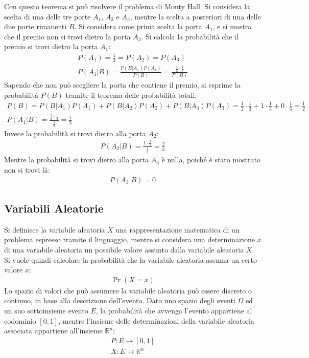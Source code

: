 \documentclass{article}
\numberwithin{equation}{subsection}
\begin{document}
Con questo teorema si può risolvere il problema di Monty Hall. Si considera la scelta di una delle tre porte $A_1$, $A_2$ e $A_3$, mentre la scelta a posteriori di una delle 
due porte rimanenti $B$. Si considera come prima scelta la porta $A_1$, e si mostra che il premio non si trovi dietro la porta $A_3$. Si calcola la probabilità che il premio 
si trovi dietro la porta $A_1$: 
\begin{gather*}
    P(A_1)=\displaystyle\frac{1}{3}=P(A_2)=P(A_3)\\
    P(A_1|B)=\displaystyle\frac{P(B|A_1)P(A_1)}{P(B)}=\frac{\displaystyle\frac{1}{2}\cdot{\frac{1}{3}}}{P(B)}
\end{gather*}
Sapendo che non può scegliere la porta che contiene il premio, si esprime la probabilità $P(B)$ tramite il teorema delle probabilità totali:
\begin{gather*}
    P(B)=P(B|A_1)P(A_1)+P(B|A_2)P(A_2)+P(B|A_3)P(A_3)=\displaystyle\frac{1}{2}\cdot\frac{1}{3}+1\cdot\frac{1}{3}+0\cdot\frac{1}{3}=\frac{1}{2}\\
    P(A_1|B)=\frac{\displaystyle\frac{1}{2}\cdot{\frac{1}{3}}}{\displaystyle\frac{1}{2}}=\frac{1}{3}
\end{gather*}
Invece la probabilità si trovi dietro alla porta $A_2$:
\begin{gather*}
    P(A_2|B)=\displaystyle\frac{1\cdot\displaystyle\frac{1}{3}}{\displaystyle\frac{1}{2}}=\frac{2}{3}
\end{gather*}
Mentre la probabilità si trovi dietro alla porta $A_3$ è nulla, poiché è stato mostrato non si trovi là:
\begin{gather*}
    P(A_3|B)=0
\end{gather*}

\subsection{Variabili Aleatorie}

Si definisce la variabile aleatoria $X$ una rappresentazione matematica di un problema espresso tramite il linguaggio, mentre si considera una determinazione $x$ di una variabile aleatoria 
un possibile 
valore assunto dalla variabile aleatoria $X$. Si vuole quindi calcolare la probabilità che la variabile aleatoria assuma un certo valore $x$:
\begin{gather*}
    \Pr(X=x)
\end{gather*}
Lo spazio di valori che può assumere la variabile aleatoria può essere discreto o continuo, in base alla descrizione dell'evento. Dato uno spazio degli eventi $\Omega$ ed 
un suo sottoinsieme evento $E$, la probabilità che avvenga l'evento appartiene al codominio $[0,1]$, mentre l'insieme delle determinazioni della variabile aleatoria 
associata appartiene all'insieme $\mathbb{R}^n$:
\begin{gather*}
    P: E\to[0,1]\\
    X:E\to\mathbb{R}^n
\end{gather*}
\end{document}
